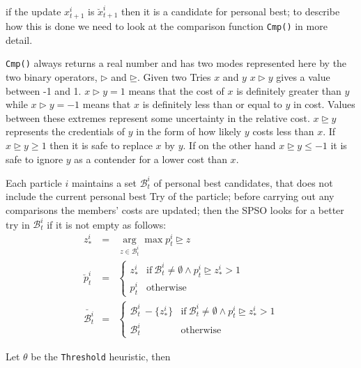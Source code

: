 \documentclass[a4paper,oneside,english]{book}
\numberwithin{equation}{section}
\numberwithin{figure}{section}
\begin{document}
if the update  $x_{t+1}^i$  is $\breve{x}_{t+1}^i$ then it is a candidate for personal best; to describe how this is done we need to look at the comparison function \texttt{Cmp()} in more detail. 

\texttt{Cmp()}  always returns a real number and has two modes represented here by the two binary operators, $\rhd$ and $\unrhd$. Given two Tries $x$ and $y$ $x \rhd y$ gives a value between -1 and 1. $x \rhd y=1$ means that the cost of $x$ is definitely greater than $y$ while $x \rhd y=-1$  means that $x$ is definitely less than or equal to $y$ in cost. Values between these extremes represent some uncertainty in the relative cost. $x \unrhd y$ represents the credentials of $y$ in the form of how likely $y$ costs less than $x$. If  $x \unrhd y \geq 1$ then it is safe to replace $x$ by $y$. If on the other hand  $x \unrhd y \leq -1$ it is safe to ignore $y$ as a contender for a lower cost than $x$.  

Each particle $i$ maintains a set $\mathcal{B}^i_t$ of personal best candidates, that does not include the current personal best Try of the particle; before carrying out any comparisons the members' costs are updated; then the SPSO looks for a better try in $\mathcal{B}^i_t$  if it is not empty as follows: 
 \begin{align}
 	z^i_*&=&  \underset{z\in \mathcal{B}^i_{t}}{\arg } \max p^i_t \unrhd z \\
 	\breve{p}^i_t& =&  \left\lbrace
 	\begin{array}{cc}
 		z^i_*& \mathrm{ if}\: \mathcal{B}^i_{t}\neq \emptyset \wedge p^i_t \unrhd z^i_* > 1 \\
 		p^i_t&\mathrm{otherwise}
 	\end{array}\right. \\
 \breve{\mathcal{B}^i_{t}}&=&\left\lbrace
 	\begin{array}{cc}
 		 \mathcal{B}^i_{t}\ -\{z^i_*  \}&\mathrm{ if}\: \mathcal{B}^i_{t}\neq \emptyset \wedge p^i_t \unrhd z^i_* > 1 \\
 		  \mathcal{B}^i_{t} &\mathrm{otherwise}
 	\end{array}\right.
 \end{align}


Let $\theta$ be the \texttt{Threshold} heuristic, then 
\end{document}
